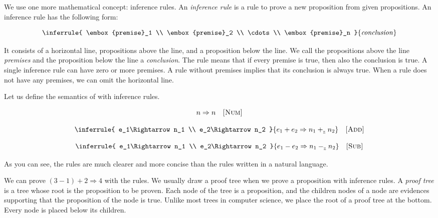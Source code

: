 
\vspace{-1em}


\vspace{-1em}


We use one more mathematical concept: inference rules. An \textit{inference
rule} is a rule to prove a new proposition from given
propositions. An inference rule has the following form:

\[
  \inferrule
  { \embox{premise}_1 \\ \embox{premise}_2 \\ \cdots \\ \embox{premise}_n }
  { \embox{conclusion} }
\]

It consists of a horizontal line, propositions above the line, and a proposition
below the line. We call the propositions above the line
\textit{premises} and the proposition below the line a
\textit{conclusion}. The rule means that if every premise is
true, then also the conclusion is true. A single inference rule can have zero or
more premises. A rule without premises implies that its conclusion is always
true. When a rule does not have any premises, we can omit the horizontal line.

Let us define the semantics of \lang with inference rules.

\[
  n\Rightarrow n
  \quad\textsc{[Num]}
\]

\[
  \inferrule
  { e_1\Rightarrow n_1 \\ e_2\Rightarrow n_2 }
  { e_1+e_2\Rightarrow n_1\iadd n_2 }
  \quad\textsc{[Add]}
\]

\[
  \inferrule
  { e_1\Rightarrow n_1 \\ e_2\Rightarrow n_2 }
  { e_1-e_2\Rightarrow n_1\isub n_2 }
  \quad\textsc{[Sub]}
\]

As you can see, the rules are much clearer and more concise than the rules
written in a natural language.

We can prove $(3-1)+2\Rightarrow4$ with the rules. We usually draw a proof tree
when we prove a proposition with inference rules. A \textit{proof
tree} is a tree whose root is the proposition to be proven.
Each node of the tree is a proposition, and the children nodes of a node are
evidences supporting that the proposition of the node is true. Unlike most trees in
computer science, we place the root of a proof tree at the bottom. Every node is
placed below its children.

